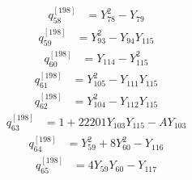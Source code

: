 \begin{equation}\label{q198:row:058}
\begin{aligned}
q_{58}^{[198]} &={} Y_{78}^{2} - Y_{79}
\end{aligned}
\end{equation}
\begin{equation}\label{q198:row:059}
\begin{aligned}
q_{59}^{[198]} &={} Y_{93}^{2} - Y_{94}Y_{115}
\end{aligned}
\end{equation}
\begin{equation}\label{q198:row:060}
\begin{aligned}
q_{60}^{[198]} &={} Y_{114} - Y_{115}^{2}
\end{aligned}
\end{equation}
\begin{equation}\label{q198:row:061}
\begin{aligned}
q_{61}^{[198]} &={} Y_{105}^{2} - Y_{111}Y_{115}
\end{aligned}
\end{equation}
\begin{equation}\label{q198:row:062}
\begin{aligned}
q_{62}^{[198]} &={} Y_{104}^{2} - Y_{112}Y_{115}
\end{aligned}
\end{equation}
\begin{equation}\label{q198:row:063}
\begin{aligned}
q_{63}^{[198]} &={} 1 + 22201Y_{103}Y_{115} - AY_{103}
\end{aligned}
\end{equation}
\begin{equation}\label{q198:row:064}
\begin{aligned}
q_{64}^{[198]} &={} Y_{59}^{2} + 8Y_{60}^{2} - Y_{116}
\end{aligned}
\end{equation}
\begin{equation}\label{q198:row:065}
\begin{aligned}
q_{65}^{[198]} &={} 4Y_{59}Y_{60} - Y_{117}
\end{aligned}
\end{equation}
